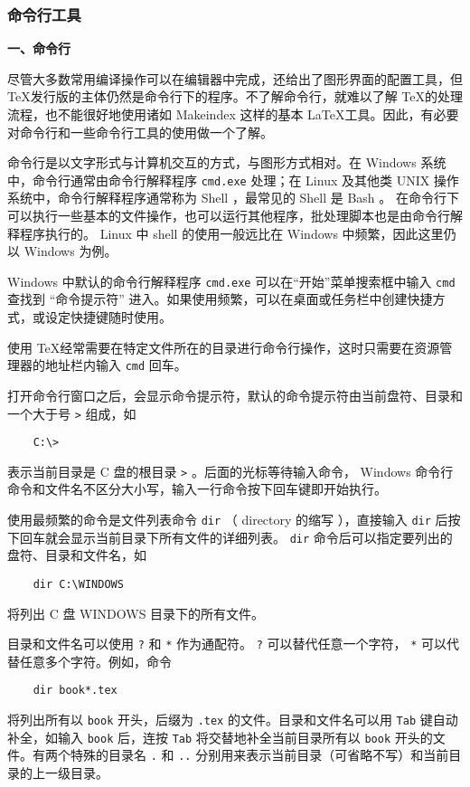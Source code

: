 \subsubsection{命令行工具}

\textbf{一、命令行}

尽管大多数常用编译操作可以在编辑器中完成，\texlive 还给出了图形界面的配置工具，但 \TeX 发行版的主体仍然是命令行下的程序。不了解命令行，就难以了解 \TeX 的处理流程，也不能很好地使用诸如 Makeindex 这样的基本 \LaTeX 工具。因此，有必要对命令行和一些命令行工具的使用做一个了解。

命令行是以文字形式与计算机交互的方式，与图形方式相对。在 Windows 系统中，命令行通常由命令行解释程序 \verb|cmd.exe| 处理；在 Linux 及其他类 UNIX 操作系统中，命令行解释程序通常称为 Shell ，最常见的 Shell 是 Bash 。 在命令行下可以执行一些基本的文件操作，也可以运行其他程序，批处理脚本也是由命令行解释程序执行的。 Linux 中 shell 的使用一般远比在 Windows 中频繁，因此这里仍以 Windows 为例。

Windows 中默认的命令行解释程序 \verb|cmd.exe| 可以在“开始”菜单搜索框中输入 \verb|cmd| 查找到 “命令提示符” 进入。如果使用频繁，可以在桌面或任务栏中创建快捷方式，或设定快捷键随时使用。

使用 \TeX 经常需要在特定文件所在的目录进行命令行操作，这时只需要在资源管理器的地址栏内输入 \verb|cmd| 回车。

打开命令行窗口之后，会显示命令提示符，默认的命令提示符由当前盘符、目录和一个大于号 \verb|>| 组成，如
\begin{lstlisting}
    C:\>
\end{lstlisting}
表示当前目录是 C 盘的根目录 \verb|>| 。后面的光标等待输入命令， Windows 命令行命令和文件名不区分大小写，输入一行命令按下回车键即开始执行。

使用最频繁的命令是文件列表命令 \verb|dir| （ directory 的缩写 ），直接输入 \verb|dir| 后按下回车就会显示当前目录下所有文件的详细列表。 \verb|dir| 命令后可以指定要列出的盘符、目录和文件名，如
\begin{lstlisting}
    dir C:\WINDOWS
\end{lstlisting}
将列出 C 盘 WINDOWS 目录下的所有文件。

目录和文件名可以使用 \verb|?| 和 \verb|*| 作为通配符。 \verb|?| 可以替代任意一个字符， \verb|*| 可以代替任意多个字符。例如，命令
\begin{lstlisting}
    dir book*.tex
\end{lstlisting}
将列出所有以 \verb|book| 开头，后缀为 \verb|.tex| 的文件。目录和文件名可以用 \verb|Tab| 键自动补全，如输入 \verb|book| 后，连按 \verb|Tab| 将交替地补全当前目录所有以 \verb|book| 开头的文件。有两个特殊的目录名 \verb|.| 和 \verb|..| 分别用来表示当前目录（可省略不写）和当前目录的上一级目录。

